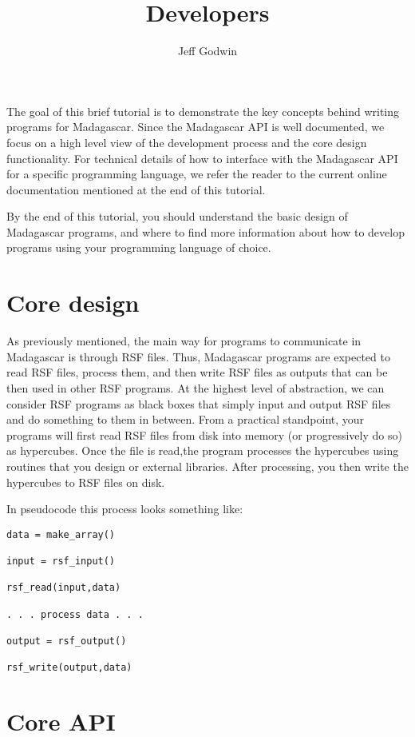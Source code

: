 \title{Developers}
\author{Jeff Godwin}
\maketitle

The goal of this brief tutorial is to demonstrate the key concepts
behind writing programs for Madagascar.  Since the Madagascar API is
well documented, we focus on a high level view of the development
process and the core design functionality.  For technical details of
how to interface with the Madagascar API for a specific programming
language, we refer the reader to the current online documentation
mentioned at the end of this tutorial.

By the end of this tutorial, you should understand the basic design of
Madagascar programs, and where to find more information about how to
develop programs using your programming language of choice.

\section{Core design}

As previously mentioned, the main way for programs to communicate in
Madagascar is through RSF files.  Thus, Madagascar programs are
expected to read RSF files, process them, and then write RSF files as
outputs that can be then used in other RSF programs.  At the highest
level of abstraction, we can consider RSF programs as black boxes that
simply input and output RSF files and do something to them in between.
From a practical standpoint, your programs will first read RSF files
from disk into memory (or progressively do so) as hypercubes.  Once
the file is read,the program processes the hypercubes using routines
that you design or external libraries.  After processing, you then
write the hypercubes to RSF files on disk.

In pseudocode this process looks something like:
\begin{verbatim}
data = make_array()

input = rsf_input()

rsf_read(input,data) 

. . . process data . . .

output = rsf_output()

rsf_write(output,data)
\end{verbatim}

\section{Core API}

